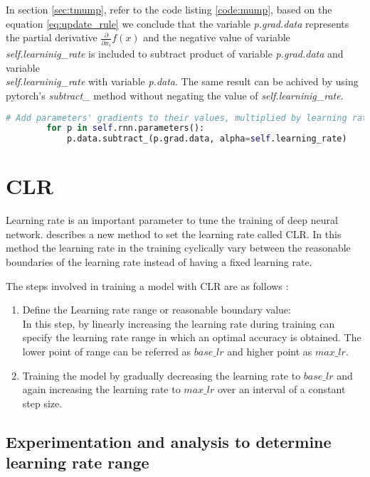 In section \ref{sec:tmump}, refer to the code listing \ref{code:mump}, based on the equation \ref{eq:update_rule} we conclude that the variable \textit{p.grad.data} represents the partial derivative \( \frac{\partial}{\partial x_i} f(x) \) and the negative value of variable \textit{self.learninig\_rate} is included to subtract product of  variable \textit{p.grad.data} and variable \\ \textit{self.learninig\_rate} with variable \textit{p.data}. The same result can be achived by using pytorch's  \textit{subtract\_} method without negating the value of \textit{self.learninig\_rate}.

\begin{lstlisting}[language=Python,caption={Manual gradient updation with substract\_}, label={code:mumps}]
    # Add parameters' gradients to their values, multiplied by learning rate
        for p in self.rnn.parameters():
            p.data.subtract_(p.grad.data, alpha=self.learning_rate)
\end{lstlisting}

\section{\acf{CLR}}

Learning rate is an important parameter to tune the training of deep neural network. \parencite{Smith.03062015} describes a new method to set the learning rate called \acf{CLR}. In this method the learning rate in the training cyclically vary between the reasonable boundaries of the learning rate instead of having a fixed learning rate.

The steps involved in training a model with \acs{CLR} are as follows :

\begin{enumerate}
    \item Define the Learning rate range or reasonable boundary value: \\
    In this step, by linearly increasing the learning rate during training can specify the learning rate range in which an optimal accuracy is obtained. The lower point of range can be referred as $base\_lr$ and higher point as $max\_lr$.
    \item Training the model by gradually decreasing the learning rate to $base\_lr$ and again increasing the learning rate to $max\_lr$ over an interval of a constant step size.
\end{enumerate}


\subsection*{Experimentation and analysis to determine learning rate range}

